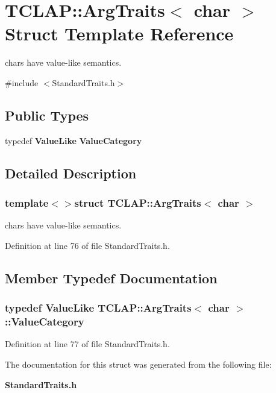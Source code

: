 \section{T\+C\+L\+A\+P\+:\+:Arg\+Traits$<$ char $>$ Struct Template Reference}
\label{structTCLAP_1_1ArgTraits_3_01char_01_4}


chars have value-\/like semantics.  




{\ttfamily \#include $<$Standard\+Traits.\+h$>$}

\subsection*{Public Types}
\begin{DoxyCompactItemize}
\item 
typedef {\bf Value\+Like} {\bf Value\+Category}
\end{DoxyCompactItemize}


\subsection{Detailed Description}
\subsubsection*{template$<$$>$struct T\+C\+L\+A\+P\+::\+Arg\+Traits$<$ char $>$}

chars have value-\/like semantics. 

Definition at line 76 of file Standard\+Traits.\+h.



\subsection{Member Typedef Documentation}
\subsubsection[{Value\+Category}]{\setlength{\rightskip}{0pt plus 5cm}typedef {\bf Value\+Like} {\bf T\+C\+L\+A\+P\+::\+Arg\+Traits}$<$ char $>$\+::{\bf Value\+Category}}\label{structTCLAP_1_1ArgTraits_3_01char_01_4_a36f7fe1b3b1649ef8ec08ef7d6fc3160}


Definition at line 77 of file Standard\+Traits.\+h.



The documentation for this struct was generated from the following file\+:\begin{DoxyCompactItemize}
\item 
{\bf Standard\+Traits.\+h}\end{DoxyCompactItemize}
